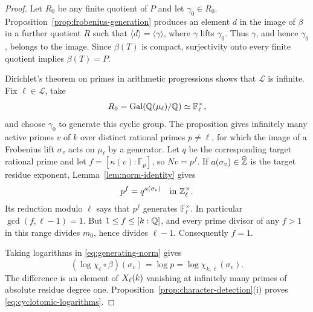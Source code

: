 \begin{proof}
Let $R_0$ be any finite quotient of $P$ and let $\gamma_0\in R_0$.
Proposition~\ref{prop:frobenius-generation} produces an element
$d$ in the image of $\beta$ in a further quotient $R$ such that
$\langle d\rangle=\langle\gamma\rangle$, where $\gamma$ lifts
$\gamma_0$. Thus $\gamma$, and hence $\gamma_0$, belongs to the
image. Since $\beta(T)$ is compact, surjectivity onto every finite
quotient implies $\beta(T)=P$.

Dirichlet's theorem on primes in arithmetic progressions shows
that $\mathcal L$ is infinite. Fix $\ell\in\mathcal L$, take
\[
 R_0=\operatorname{Gal}(\mathbb Q(\mu_\ell)/\mathbb Q)\simeq\mathbb F_\ell^\times,
\]
and choose $\gamma_0$ to generate this cyclic group.
The proposition gives infinitely many active primes $v$ of $k$
over distinct rational primes $p\ne\ell$, for which the image of
a Frobenius lift $\sigma_v$ acts on $\mu_\ell$ by a generator.
Let $q$ be the corresponding target rational prime and let
$f=[\kappa(v):\mathbb F_p]$, so $Nv=p^f$. If
$a(\sigma_v)\in\widehat{\mathbb Z}$ is the target residue exponent,
Lemma~\ref{lem:norm-identity} gives
\begin{equation}\label{eq:generating-norm}
  p^f=q^{a(\sigma_v)}\quad\text{in }\mathbb Z_\ell^\times.
\end{equation}
Its reduction modulo $\ell$ says that $p^f$ generates
$\mathbb F_\ell^\times$. In particular $\gcd(f,\ell-1)=1$.
But $1\leq f\leq[k:\mathbb Q]$, and every prime divisor of any $f>1$
in this range divides $m_0$, hence divides $\ell-1$.
Consequently $f=1$.

Taking logarithms in \eqref{eq:generating-norm} gives
\[
 (\log\chi_\ell\circ\beta)(\sigma_v)
   =\log p
   =\log\chi_{k,\ell}(\sigma_v).
\]
The difference is an element of $X_{\ell}(k)$ vanishing at
infinitely many primes of absolute residue degree one.
Proposition~\ref{prop:character-detection}(i) proves
\eqref{eq:cyclotomic-logarithms}.
\end{proof}
